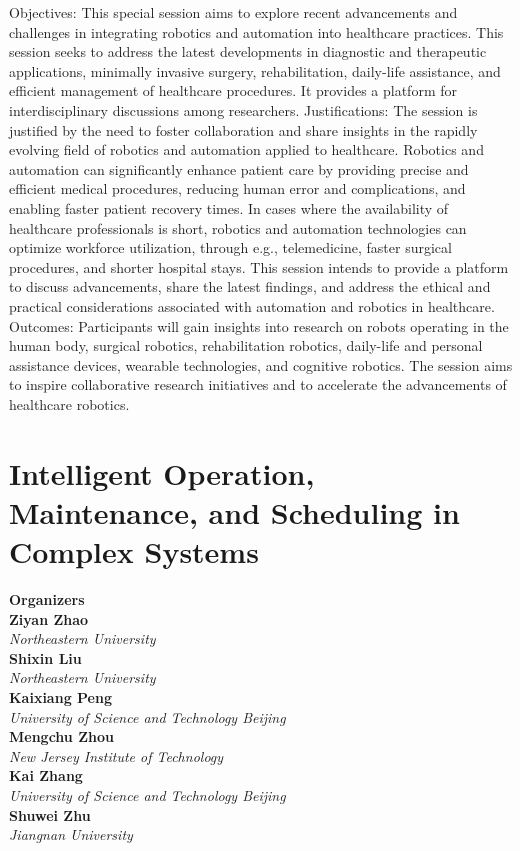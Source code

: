 Objectives: This special session aims to explore recent advancements and challenges in integrating robotics and automation into healthcare practices. This session seeks to address the latest developments in diagnostic and therapeutic applications, minimally invasive surgery, rehabilitation, daily-life assistance, and efficient management of healthcare procedures. It provides a platform for interdisciplinary discussions among researchers.   Justifications:  The session is justified by the need to foster collaboration and share insights in the rapidly evolving field of robotics and automation applied to healthcare. Robotics and automation can significantly enhance patient care by providing precise and efficient medical procedures, reducing human error and complications, and enabling faster patient recovery times. In cases where the availability of healthcare professionals is short, robotics and automation technologies can optimize workforce utilization, through e.g., telemedicine, faster surgical procedures, and shorter hospital stays. This session intends to provide a platform to discuss advancements, share the latest findings, and address the ethical and practical considerations associated with automation and robotics in healthcare.   Outcomes: Participants will gain insights into research on robots operating in the human body, surgical robotics, rehabilitation robotics, daily-life and personal assistance devices, wearable technologies, and cognitive robotics. The session aims to inspire collaborative research initiatives and to accelerate the advancements of healthcare robotics. 

\section{Intelligent Operation, Maintenance, and Scheduling in Complex Systems}


\large \textbf{Organizers} \normalsize \vspace{2mm} \\
\textbf{Ziyan  Zhao} \\ 
\textit{Northeastern University} \vspace{{2mm}} \\
\textbf{Shixin  Liu} \\ 
\textit{Northeastern University} \vspace{{2mm}} \\
\textbf{Kaixiang  Peng} \\ 
\textit{University of Science and Technology Beijing} \vspace{{2mm}} \\
\textbf{Mengchu  Zhou} \\ 
\textit{New Jersey Institute of Technology} \vspace{{2mm}} \\
\textbf{Kai  Zhang} \\ 
\textit{University of Science and Technology Beijing} \vspace{{2mm}} \\
\textbf{Shuwei  Zhu} \\ 
\textit{Jiangnan University}

